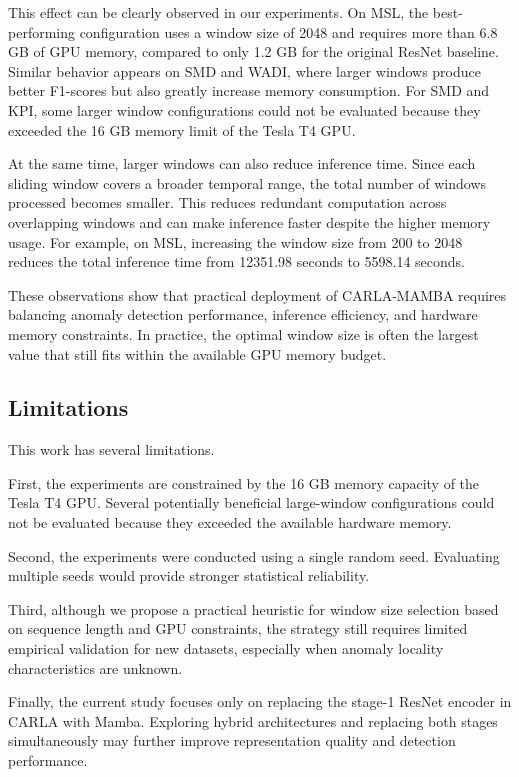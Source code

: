\documentclass[runningheads]{llncs}
\begin{document}
This effect can be clearly observed in our experiments. On MSL, the best-performing configuration uses a window size of 2048 and requires more than 6.8 GB of GPU memory, compared to only 1.2 GB for the original ResNet baseline. Similar behavior appears on SMD and WADI, where larger windows produce better F1-scores but also greatly increase memory consumption. For SMD and KPI, some larger window configurations could not be evaluated because they exceeded the 16 GB memory limit of the Tesla T4 GPU.

At the same time, larger windows can also reduce inference time. Since each sliding window covers a broader temporal range, the total number of windows processed becomes smaller. This reduces redundant computation across overlapping windows and can make inference faster despite the higher memory usage. For example, on MSL, increasing the window size from 200 to 2048 reduces the total inference time from 12351.98 seconds to 5598.14 seconds.

These observations show that practical deployment of CARLA-MAMBA requires balancing anomaly detection performance, inference efficiency, and hardware memory constraints. In practice, the optimal window size is often the largest value that still fits within the available GPU memory budget.

\subsection{Limitations}

This work has several limitations.

First, the experiments are constrained by the 16 GB memory capacity of the Tesla T4 GPU. Several potentially beneficial large-window configurations could not be evaluated because they exceeded the available hardware memory.

Second, the experiments were conducted using a single random seed. Evaluating multiple seeds would provide stronger statistical reliability.

Third, although we propose a practical heuristic for window size selection based on sequence length and GPU constraints, the strategy still requires limited empirical validation for new datasets, especially when anomaly locality characteristics are unknown.

Finally, the current study focuses only on replacing the stage-1 ResNet encoder in CARLA with Mamba. Exploring hybrid architectures and replacing both stages simultaneously may further improve representation quality and detection performance.
\end{document}
